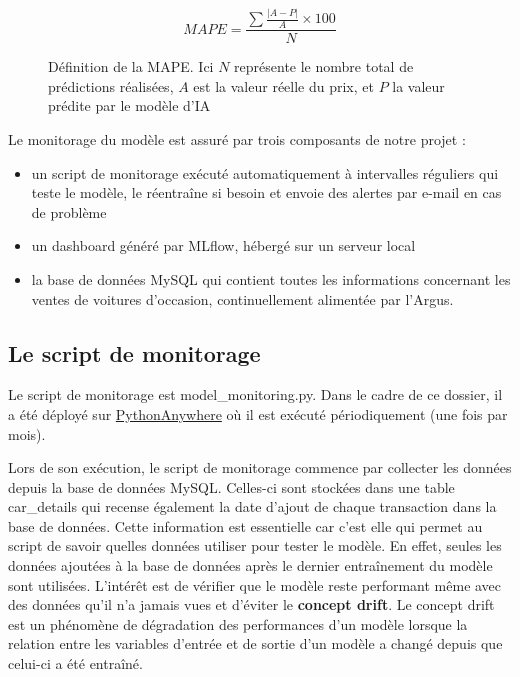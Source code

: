 \documentclass[french]{article}
\begin{document}
    \begin{figure}[h!]
        \begin{equation}MAPE = \frac {\sum \frac{\lvert A-P \rvert}{A} \times 100}{N}  \end{equation}
        \centering
        \caption{Définition de la MAPE. Ici $N$ représente le nombre total de prédictions réalisées, $A$ est la valeur réelle du prix, et $P$ la valeur prédite par le modèle d'IA}
        \centering
    \end{figure}

    Le monitorage du modèle est assuré par trois composants de notre projet :
    \begin{itemize}
        \item un script de monitorage exécuté automatiquement à intervalles réguliers qui teste le modèle, le réentraîne si besoin et envoie des alertes par e-mail en cas de problème
        \item un dashboard généré par MLflow, hébergé sur un serveur local
        \item la base de données MySQL qui contient toutes les informations concernant les ventes de voitures d'occasion, continuellement alimentée par l'Argus.
    \end{itemize}

    \subsection{Le script de monitorage}

    Le script de monitorage est model\_monitoring.py. Dans le cadre de ce dossier, il a été déployé sur \href{https://www.pythonanywhere.com/}{PythonAnywhere} où il est exécuté périodiquement (une fois par mois).

    Lors de son exécution, le script de monitorage commence par collecter les données depuis la base de données MySQL. Celles-ci sont stockées dans une table car\_details qui recense également la date d'ajout de chaque transaction dans la base de données. Cette information est essentielle car c'est elle qui permet au script de savoir quelles données utiliser pour tester le modèle. En effet, seules les données ajoutées à la base de données après le dernier entraînement du modèle sont utilisées. L'intérêt est de vérifier que le modèle reste performant même avec des données qu'il n'a jamais vues et d'éviter le \textbf{concept drift}. Le concept drift est un phénomène de dégradation des performances d'un modèle lorsque la relation entre les variables d'entrée et de sortie d'un modèle a changé depuis que celui-ci a été entraîné. 
    
\end{document}
